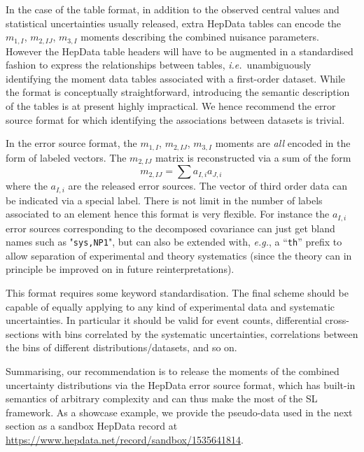 \documentclass[11pt]{article}
\def\ie{{\it i.e.}}
\def\eg{{\it e.g.}}
\newcommand{\be}{\begin{equation}}
\newcommand{\ee}{\end{equation}}
\begin{document}
In the case of the table format, in addition to the observed central values and
statistical uncertainties usually released, extra HepData tables can encode the
$m_{1,I}$, $m_{2,IJ}$, $m_{3,I}$ moments describing the combined nuisance
parameters.  However the HepData table headers will have to be augmented in a
standardised fashion to express the relationships between tables,
\ie\ unambiguously identifying the moment data tables associated with a
first-order dataset. While the format is conceptually straightforward,
introducing the semantic description of the tables is at present highly
impractical. We hence recommend the error source format for which identifying
the associations between datasets is trivial.

In the error source format, the $m_{1,I}$, $m_{2,IJ}$, $m_{3,I}$ moments are
\textit{all} encoded in the form of labeled vectors. The $m_{2,IJ}$ matrix is
reconstructed via a sum of the form \be m_{2,IJ}= \sum {a_{I,i}a_{J,i}} \, 
\label{eq:sum_errsource}
\ee
where the $a_{I,i}$ are the released error sources.
The vector of third order data can be  indicated via a special label.
There is not limit in the number of labels associated to an element hence this format is very flexible.
For instance the $a_{I,i}$ error sources corresponding to the decomposed covariance  can just get bland names such as "{\tt sys,NP1}", but  can also be extended with, \eg, a ``{\tt th}'' prefix to allow separation of experimental and theory systematics (since the theory can in principle be improved on in future reinterpretations).


This format requires some keyword standardisation.  The final scheme should
be capable of equally applying to any kind of experimental data and systematic uncertainties. In particular it should be valid for event counts,  differential cross-sections with bins correlated by the systematic uncertainties, correlations between  the bins of different distributions/datasets, and so on.


Summarising, our recommendation is to release the moments of the combined uncertainty distributions via the HepData error source format, which has built-in semantics of arbitrary complexity and can thus make the most of the SL framework. As a showcase example, we provide the pseudo-data used in the next section as a sandbox HepData record at \url{https://www.hepdata.net/record/sandbox/1535641814}.
\end{document}
